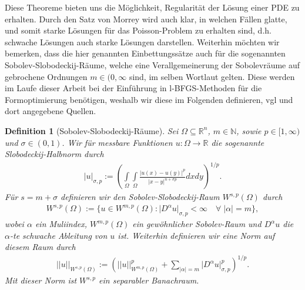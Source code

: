 \documentclass[bibliography=totoc,12pt,a4paper]{scrartcl}
\theoremstyle{exampstyle}
\newtheorem{defi}{Definition}%
\numberwithin{equation}{section}
\begin{document}
Diese Theoreme bieten uns die Möglichkeit, Regularität der Lösung einer PDE zu erhalten. Durch den Satz von Morrey wird auch klar, in welchen Fällen glatte, und somit starke Lösungen für das Poisson-Problem zu erhalten sind, d.h. schwache Lösungen auch starke Lösungen darstellen. Weiterhin möchten wir bemerken, dass die hier genannten Einbettungssätze auch für die sogenannten Sobolev-Slobodeckij-Räume, welche eine Verallgemeinerung der Sobolevräume auf gebrochene Ordnungen $m \in (0,\infty$ sind, im selben Wortlaut gelten. Diese werden im Laufe dieser Arbeit bei der Einführung in l-BFGS-Methoden für die Formoptimierung benötigen, weshalb wir diese im Folgenden definieren, vgl \cite{brokenSobolev} und dort angegebene Quellen.

\begin{defi}[Sobolev-Slobodeckij-Räume]
Sei $\Omega \subseteq \mathbb{R}^n$, $m\in\mathbb{N}$, sowie $p\in [1, \infty)$ und $\sigma\in (0,1)$. Wir für messbare Funktionen $u: \Omega \rightarrow \mathbb{R}$ die sogenannte \textit{Slobodeckij-Halbnorm} durch
\begin{align*}
	\vert u \vert _{\sigma, p} := \left(\underset{\Omega}{\int}\underset{\Omega}{\int} 
	\frac{\vert u(x) - u(y)\vert^p}{\vert x-y \vert^{n + \sigma p}}dxdy\right)^{1/p}.
\end{align*}
Für $s = m + \sigma$ definieren wir den \textit{Sobolev-Slobodeckij-Raum} $W^{s,p}(\Omega)$ durch
\begin{align*}
	W^{s,p}(\Omega) := \{ u\in W^{m,p}(\Omega) : \vert D^\alpha u \vert _{\sigma, p} < \infty 				\quad \forall \;\vert\alpha\vert = m\},
\end{align*}
wobei $\alpha$ ein Muliindex, $W^{m,p}(\Omega)$ ein gewöhnlicher Sobolev-Raum und $D^\alpha u$ die $\alpha$-te schwache Ableitung von $u$ ist.
Weiterhin definieren wir eine Norm auf diesem Raum durch
\begin{align*}
	\vert\vert u \vert\vert_{W^{s,p}(\Omega)} := (\vert\vert u \vert\vert_{W^{m,p}(\Omega)}^p + \underset{ \vert \alpha \vert = m}{\sum}\vert D^\alpha u \vert _{\sigma, p}^p)^{1/p}.
\end{align*}
Mit dieser Norm ist $W^{s,p}$ ein separabler Banachraum.
\end{defi}
\end{document}
